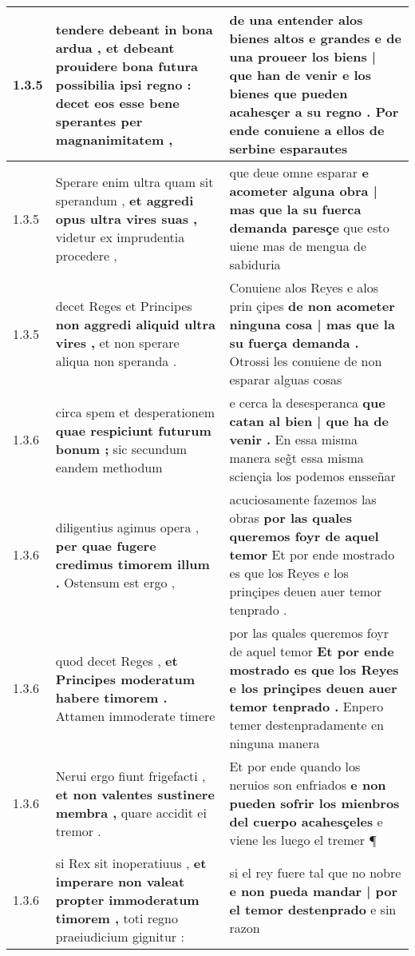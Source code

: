 \begin{tabular}{|p{1cm}|p{6.5cm}|p{6.5cm}|}
1.3.5 & tendere debeant in bona ardua , \textbf{ et debeant prouidere bona futura possibilia ipsi regno : } decet eos esse bene sperantes per magnanimitatem , & de una entender alos bienes altos e grandes \textbf{ e de una proueer los biens | que han de venir e los bienes que pueden acahesçer a su regno . } Por ende conuiene a ellos de serbine esparautes \\\hline
1.3.5 & Sperare enim ultra quam sit sperandum , \textbf{ et aggredi opus ultra vires suas , } videtur ex imprudentia procedere , & que deue omne esparar \textbf{ e acometer alguna obra | mas que la su fuerca demanda paresçe } que esto uiene mas de mengua de sabiduria \\\hline
1.3.5 & decet Reges et Principes \textbf{ non aggredi aliquid ultra vires , } et non sperare aliqua non speranda . & Conuiene alos Reyes e alos prin çipes \textbf{ de non acometer ninguna cosa | mas que la su fuerça demanda . } Otrossi les conuiene de non esparar alguas cosas \\\hline
1.3.6 & circa spem et desperationem \textbf{ quae respiciunt futurum bonum ; } sic secundum eandem methodum & e cerca la desesperanca \textbf{ que catan al bien | que ha de venir . } En essa misma manera seg̃t essa misma sciençia los podemos ensseñar \\\hline
1.3.6 & diligentius agimus opera , \textbf{ per quae fugere credimus timorem illum . } Ostensum est ergo , & acuciosamente fazemos las obras \textbf{ por las quales queremos foyr de aquel temor } Et por ende mostrado es que los Reyes e los prinçipes deuen auer temor tenprado . \\\hline
1.3.6 & quod decet Reges , \textbf{ et Principes moderatum habere timorem . } Attamen immoderate timere & por las quales queremos foyr de aquel temor \textbf{ Et por ende mostrado es que los Reyes e los prinçipes deuen auer temor tenprado . } Enpero temer destenpradamente en ninguna manera \\\hline
1.3.6 & Nerui ergo fiunt frigefacti , \textbf{ et non valentes sustinere membra , } quare accidit ei tremor . & Et por ende quando los neruios son enfriados \textbf{ e non pueden sofrir los mienbros del cuerpo acahesçeles } e viene les luego el tremer ¶ \\\hline
1.3.6 & si Rex sit inoperatiuus , \textbf{ et imperare non valeat propter immoderatum timorem , } toti regno praeiudicium gignitur : & si el rey fuere tal que no nobre \textbf{ e non pueda mandar | por el temor destenprado } e sin razon \\\hline

\end{tabular}
